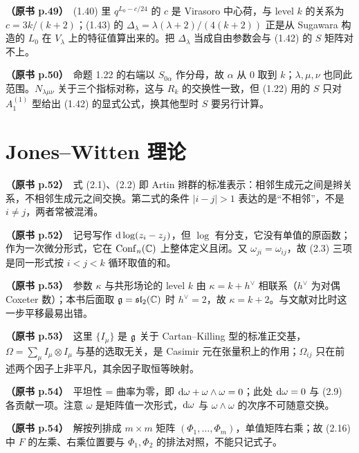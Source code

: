 \noindent \textbf{（原书 p.49）}\ (1.40) 里 $q^{L_0-c/24}$ 的 $c$ 是 Virasoro 中心荷，与 level $k$ 的关系为 $c=3k/(k+2)$；(1.43) 的 $\Delta_\lambda=\lambda(\lambda+2)/(4(k+2))$ 正是从 Sugawara 构造的 $L_0$ 在 $V_\lambda$ 上的特征值算出来的。把 $\Delta_\lambda$ 当成自由参数会与 (1.42) 的 $S$ 矩阵对不上。\par\smallskip

\noindent \textbf{（原书 p.50）}\ 命题 1.22 的右端以 $S_{0\alpha}$ 作分母，故 $\alpha$ 从 $0$ 取到 $k$；$\lambda,\mu,\nu$ 也同此范围。$N_{\lambda\mu\nu}$ 关于三个指标对称，这与 $R_k$ 的交换性一致，但 (1.22) 用的 $S$ 只对 $A_1^{(1)}$ 型给出 (1.42) 的显式公式，换其他型时 $S$ 要另行计算。\par\smallskip

\section*{Jones--Witten 理论}

\noindent \textbf{（原书 p.52）}\ 式 (2.1)、(2.2) 即 Artin 辫群的标准表示：相邻生成元之间是辫关系，不相邻生成元之间交换。第二式的条件 $|i-j|>1$ 表达的是“不相邻”，不是 $i\ne j$，两者常被混淆。\par\smallskip

\noindent \textbf{（原书 p.52）}\ 记号写作 $\mathrm{d}\log(z_i-z_j)$，但 $\log$ 有分支，它没有单值的原函数；作为一次微分形式，它在 $\operatorname{Conf}_n(\mathbb{C})$ 上整体定义且闭。又 $\omega_{ji}=\omega_{ij}$，故 (2.3) 三项是同一形式按 $i<j<k$ 循环取值的和。\par\smallskip

\noindent \textbf{（原书 p.53）}\ 参数 $\kappa$ 与共形场论的 level $k$ 由 $\kappa=k+h^\vee$ 相联系（$h^\vee$ 为对偶 Coxeter 数）；本书后面取 $\mathfrak{g}=\mathfrak{sl}_2(\mathbb{C})$ 时 $h^\vee=2$，故 $\kappa=k+2$。与文献对比时这一步平移最易出错。\par\smallskip

\noindent \textbf{（原书 p.53）}\ 这里 $\{I_\mu\}$ 是 $\mathfrak{g}$ 关于 Cartan--Killing 型的标准正交基，$\Omega=\sum_\mu I_\mu\otimes I_\mu$ 与基的选取无关，是 Casimir 元在张量积上的作用；$\Omega_{ij}$ 只在前述两个因子上非平凡，其余因子取恒等映射。\par\smallskip

\noindent \textbf{（原书 p.54）}\ 平坦性 = 曲率为零，即 $\mathrm{d}\omega+\omega\wedge\omega=0$；此处 $\mathrm{d}\omega=0$ 与 (2.9) 各贡献一项。注意 $\omega$ 是矩阵值一次形式，$\mathrm{d}\omega$ 与 $\omega\wedge\omega$ 的次序不可随意交换。\par\smallskip

\noindent \textbf{（原书 p.54）}\ 解按列排成 $m\times m$ 矩阵 $(\Phi_1,\dots,\Phi_m)$，单值矩阵右乘；故 (2.16) 中 $F$ 的左乘、右乘位置要与 $\Phi_1,\Phi_2$ 的排法对照，不能只记式子。\par\smallskip

